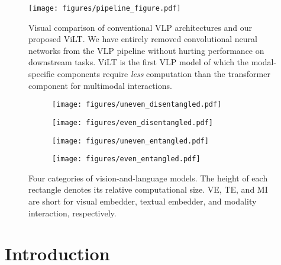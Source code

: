 \documentclass{article}
\begin{document}
\begin{figure}[t]
    \centering
    \texttt{[image: figures/pipeline\_figure.pdf]}
    \caption{
        Visual comparison of conventional VLP architectures and our proposed ViLT.
        We have entirely removed convolutional neural networks from the VLP pipeline without hurting performance on downstream tasks.
        ViLT is the first VLP model of which the modal-specific components require \textit{less} computation than the transformer component for multimodal interactions.
    }
    \label{fig:pipeline}
\end{figure}

\begin{figure*}[t]
    \begin{center}
    \begin{subfigure}[b]{.25\textwidth}
        \centering
        \texttt{[image: figures/uneven\_disentangled.pdf]}
        \caption{}
        \label{sfig:uneven_disentangled}
    \end{subfigure}\hfill
    \begin{subfigure}[b]{.25\textwidth}
        \centering
        \texttt{[image: figures/even\_disentangled.pdf]}
        \caption{}
        \label{sfig:even_disentangled}
    \end{subfigure}\hfill
    \begin{subfigure}[b]{.25\textwidth}
        \centering
        \texttt{[image: figures/uneven\_entangled.pdf]}
        \caption{}
        \label{sfig:uneven_entangled}
    \end{subfigure}\hfill
    \begin{subfigure}[b]{.25\textwidth}
        \centering
        \texttt{[image: figures/even\_entangled.pdf]}
        \caption{}
        \label{sfig:even_entangled}
    \end{subfigure}\hfill
    \caption{Four categories of vision-and-language models. The height of each rectangle denotes its relative computational size. VE, TE, and MI are short for visual embedder, textual embedder, and modality interaction, respectively.}
    \label{fig:taxonomy}
    \end{center}
\end{figure*}

\section{Introduction}
\label{sec:intro}
\end{document}
